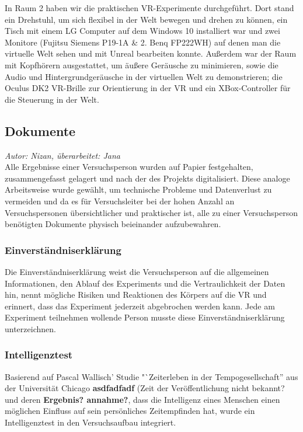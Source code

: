 \documentclass{Bericht}
\begin{document}
In Raum 2 haben wir die praktischen VR-Experimente durchgeführt. Dort stand ein Drehstuhl, um sich flexibel in der Welt bewegen und drehen zu können, ein Tisch mit einem LG Computer auf dem  Windows 10 installiert war und zwei Monitore (Fujitsu Siemens P19-1A \& 2. Benq FP222WH) auf denen man die virtuelle Welt sehen und mit Unreal bearbeiten konnte. Außerdem war der Raum mit Kopfhörern ausgestattet, um äußere Geräusche zu minimieren, sowie die Audio und Hintergrundgeräusche in der virtuellen Welt zu demonstrieren; die Oculus DK2 VR-Brille zur Orientierung in der VR und ein XBox-Controller für die Steuerung in der Welt.

\label{subsec:dokumente}
\subsection{Dokumente}

\textit{Autor: Nizan, überarbeitet: Jana}\\
Alle Ergebnisse einer Versuchsperson wurden auf Papier festgehalten, zusammengefasst gelagert und nach der des Projekts digitalisiert. Diese analoge Arbeitsweise wurde gewählt, um technische Probleme und Datenverlust zu vermeiden und da es für Versuchsleiter bei der hohen Anzahl an Versuchspersonen übersichtlicher und praktischer ist, alle zu einer Versuchsperson benötigten Dokumente physisch beieinander aufzubewahren.

\subsubsection{Einverständniserklärung}

Die Einverständniserklärung weist die Versuchsperson auf die allgemeinen Informationen, den Ablauf des Experiments und die Vertraulichkeit der Daten hin, nennt mögliche Risiken und Reaktionen des Körpers auf die VR und erinnert, dass das Experiment jederzeit abgebrochen werden kann. Jede am Experiment teilnehmen wollende Person musste diese Einverständniserklärung unterzeichnen.

\subsubsection{Intelligenztest}
Basierend auf Pascal Wallisch' Studie "`Zeiterleben in der Tempogesellschaft'' aus der Universität Chicago \textbf{asdfadfadf} (Zeit der Veröffentlichung nicht bekannt? \cite{Tempo} und deren \textbf{Ergebnis? annahme?}, dass die Intelligenz eines Menschen einen möglichen Einfluss auf sein persönliches Zeitempfinden hat, wurde ein Intelligenztest in den Versuchsaufbau integriert.
\end{document}
